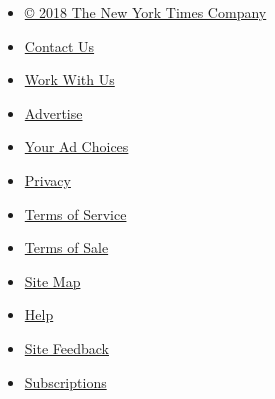 \begin{itemize}
\tightlist
\item
  \href{http://www.nytco.com}{© 2018 The New York Times Company}
\item
  \href{http://www.nytimes3xbfgragh.onion/ref/membercenter/help/infoservdirectory.html}{Contact
  Us}
\item
  \href{http://www.nytco.com/careers}{Work With Us}
\item
  \href{http://www.nytimes.whsites.net/mediakit}{Advertise}
\item
  \href{http://www.nytimes3xbfgragh.onion/content/help/rights/privacy/policy/privacy-policy.html\#pp}{Your
  Ad Choices}
\item
  \href{http://www.nytimes3xbfgragh.onion/privacy}{Privacy}
\item
  \href{http://www.nytimes3xbfgragh.onion/ref/membercenter/help/agree.html}{Terms
  of Service}
\item
  \href{http://www.nytimes3xbfgragh.onion/content/help/rights/sale/terms-of-sale.html}{Terms
  of Sale}
\end{itemize}

\begin{itemize}
\tightlist
\item
  \href{http://spiderbites.nytimes3xbfgragh.onion}{Site Map}
\item
  \href{http://www.nytimes3xbfgragh.onion/membercenter/sitehelp.html}{Help}
\item
  \href{https://myaccount.nytimes3xbfgragh.onion/membercenter/feedback.html}{Site
  Feedback}
\item
  \href{http://www.nytimes3xbfgragh.onion/subscriptions/Multiproduct/lp5558.html?campaignId=37WXW}{Subscriptions}
\end{itemize}
